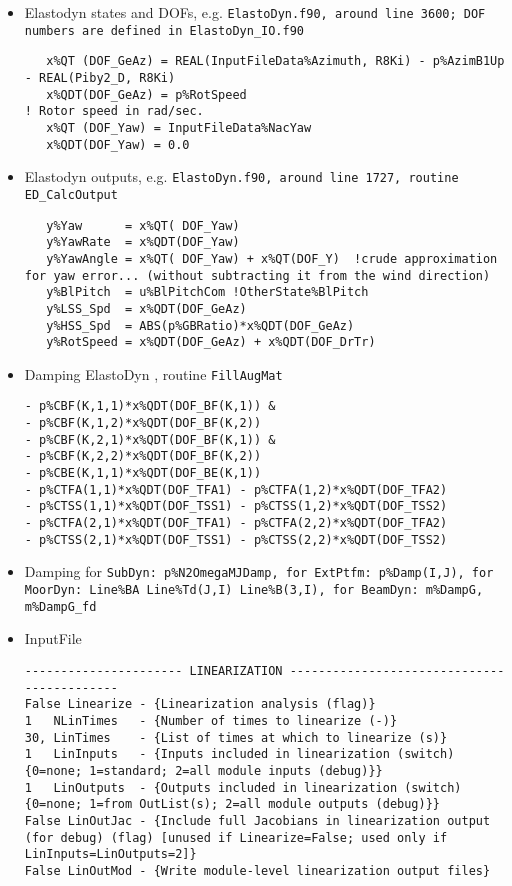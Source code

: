 \documentclass[11pt]{article}
\begin{document}
\begin{itemize}
\item  Elastodyn states and DOFs, e.g. \tt{ElastoDyn.f90}, around line 3600; DOF numbers are defined in \tt{ElastoDyn\_IO.f90}
\begin{lstlisting}
   x%QT (DOF_GeAz) = REAL(InputFileData%Azimuth, R8Ki) - p%AzimB1Up - REAL(Piby2_D, R8Ki)
   x%QDT(DOF_GeAz) = p%RotSpeed                                               ! Rotor speed in rad/sec.
   x%QT (DOF_Yaw) = InputFileData%NacYaw
   x%QDT(DOF_Yaw) = 0.0
 \end{lstlisting}
\item  Elastodyn outputs, e.g. \tt{ElastoDyn.f90}, around line 1727, routine \tt{ED\_CalcOutput}
\begin{lstlisting}
   y%Yaw      = x%QT( DOF_Yaw)
   y%YawRate  = x%QDT(DOF_Yaw)
   y%YawAngle = x%QT( DOF_Yaw) + x%QT(DOF_Y)  !crude approximation for yaw error... (without subtracting it from the wind direction)   
   y%BlPitch  = u%BlPitchCom !OtherState%BlPitch
   y%LSS_Spd  = x%QDT(DOF_GeAz)
   y%HSS_Spd  = ABS(p%GBRatio)*x%QDT(DOF_GeAz)
   y%RotSpeed = x%QDT(DOF_GeAz) + x%QDT(DOF_DrTr)
 \end{lstlisting}
 \item Damping ElastoDyn , routine \tt{FillAugMat}
\begin{lstlisting}
- p%CBF(K,1,1)*x%QDT(DOF_BF(K,1)) &
- p%CBF(K,1,2)*x%QDT(DOF_BF(K,2))
- p%CBF(K,2,1)*x%QDT(DOF_BF(K,1)) &
- p%CBF(K,2,2)*x%QDT(DOF_BF(K,2))
- p%CBE(K,1,1)*x%QDT(DOF_BE(K,1))
- p%CTFA(1,1)*x%QDT(DOF_TFA1) - p%CTFA(1,2)*x%QDT(DOF_TFA2)
- p%CTSS(1,1)*x%QDT(DOF_TSS1) - p%CTSS(1,2)*x%QDT(DOF_TSS2)
- p%CTFA(2,1)*x%QDT(DOF_TFA1) - p%CTFA(2,2)*x%QDT(DOF_TFA2)
- p%CTSS(2,1)*x%QDT(DOF_TSS1) - p%CTSS(2,2)*x%QDT(DOF_TSS2)
\end{lstlisting}
\item Damping for \tt{SubDyn}: \tt{p\%N2OmegaMJDamp}, for \tt{ExtPtfm}:  \tt{p\%Damp(I,J)}, for \tt{MoorDyn}: \tt{Line\%BA} \tt{Line\%Td(J,I)} \tt{Line\%B(3,I)}, for \tt{BeamDyn}: \tt{m\%DampG}, \tt{m\%DampG\_fd}


\item InputFile
\begin{lstlisting}
---------------------- LINEARIZATION -------------------------------------------
False Linearize - {Linearization analysis (flag)}
1   NLinTimes   - {Number of times to linearize (-)}
30, LinTimes    - {List of times at which to linearize (s)}
1   LinInputs   - {Inputs included in linearization (switch) {0=none; 1=standard; 2=all module inputs (debug)}}
1   LinOutputs  - {Outputs included in linearization (switch) {0=none; 1=from OutList(s); 2=all module outputs (debug)}}
False LinOutJac - {Include full Jacobians in linearization output (for debug) (flag) [unused if Linearize=False; used only if LinInputs=LinOutputs=2]}
False LinOutMod - {Write module-level linearization output files}
\end{lstlisting}

\end{itemize}
\end{document}
